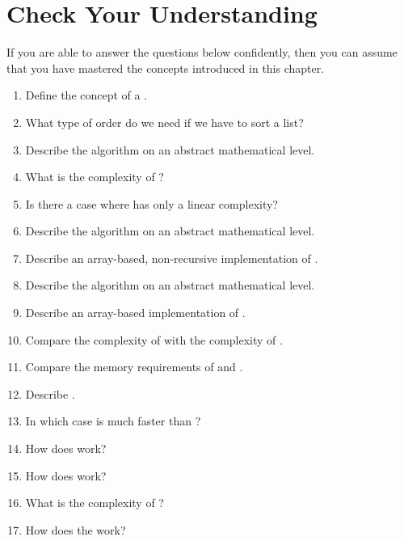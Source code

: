 \section{Check Your Understanding}
If you are able to answer the questions below confidently, then you can assume that you have mastered the concepts
introduced in this chapter.
\begin{enumerate}
\item Define the concept of a .
\item What type of order do we need if we have to sort a list?
\item Describe the algorithm  on an abstract mathematical level.
\item What is the complexity of ?
\item Is there a case where   has only a linear complexity?
\item Describe the algorithm  on an abstract mathematical level.
\item Describe an array-based, non-recursive implementation of .
\item Describe the algorithm  on an abstract mathematical level.
\item Describe an array-based implementation of .
\item Compare the complexity of  with the complexity of .
\item Compare the memory requirements of  and .
\item Describe .
\item In which case is  much faster than ?
\item How does  work?
\item How does  work?
\item What is the complexity of ?
\item How does the  work?
\end{enumerate}

